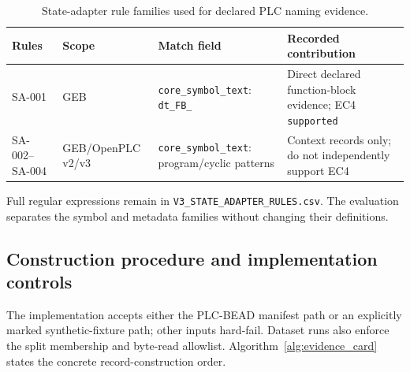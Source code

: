 \documentclass[a4paper,fleqn]{cas-dc}
\begin{document}
\begin{table}[t]
\centering
\normalsize
\caption{State-adapter rule families used for declared PLC naming evidence.}
\label{tab:s5_3}
\begin{tabularx}{\textwidth}{>{\raggedright\arraybackslash}X>{\raggedright\arraybackslash}X>{\raggedright\arraybackslash}X>{\raggedright\arraybackslash}X}
\toprule
Rules & Scope & Match field & Recorded contribution \\
\midrule
SA-001 & GEB & \texttt{core\_symbol\_text}: \texttt{dt\_FB\_} & Direct declared function-block evidence; EC4 \texttt{supported} \\
SA-002--SA-004 & GEB/OpenPLC v2/v3 & \texttt{core\_symbol\_text}: program/cyclic patterns & Context records only; do not independently support EC4 \\
\bottomrule
\end{tabularx}
\end{table}

Full regular expressions remain in \texttt{V3\_STATE\_ADAPTER\_RULES.csv}. The evaluation separates the symbol and metadata families without changing their definitions.

\subsection{Construction procedure and implementation controls}

The implementation accepts either the PLC-BEAD manifest path or an explicitly marked synthetic-fixture path; other inputs hard-fail. Dataset runs also enforce the split membership and byte-read allowlist. Algorithm~\ref{alg:evidence_card} states the concrete record-construction order.
\end{document}
